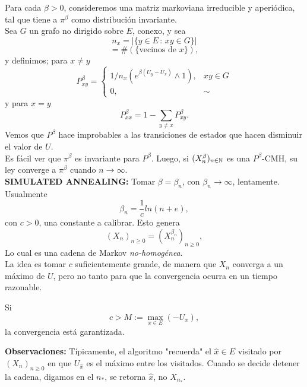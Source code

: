 Para cada $\beta >0$, consideremos una matriz markoviana irreducible y aperiódica, tal que tiene a $\pi^\beta$ como distribución invariante. \\ Sea $G$ un grafo no dirigido sobre $E$, conexo, y sea
\[n_x = |\{y \in E\,:\,xy \in G\}|\]
\[= \#\left(\{\text{vecinos de }x\}\right),\]
y definimos; para $x\neq y$
\[P_{xy}^\beta = \begin{cases}
1/n_x\left(e^{\beta(U_y-U_x)}\wedge 1\right), & xy\in G\\
0, & \sim
\end{cases}\]
y para $x=y$
\[P_{xx}^\beta = 1-\sum_{y \neq x}P_{xy}^\beta. \]
Vemos que $P^\beta$ hace improbables a las transiciones de estados que hacen disminuir el valor de $U$.\\ Es fácil ver que $\pi^\beta$ es invariante para $P^\beta$. Luego, si $(X_n^\beta)_{n\in \mathbb N}$ es una $P^\beta$-CMH, su ley converge a $\pi^\beta$ cuando $n\rightarrow \infty$. \\ \newline
\textbf{SIMULATED ANNEALING: }Tomar $\beta = \beta_n$, con $\beta_n \rightarrow \infty$, lentamente.\\ \newline
Usualmente
\[\beta_n = \frac{1}{c}ln(n+e),\]
con $c>0$, una constante a calibrar. Esto genera
\[(X_n)_{n\geq0} = (X_n^{\beta_n})_{n\geq 0},\]
Lo cual es una cadena de Markov \textit{no-homogénea}.\\La idea es tomar $c$ suficientemente grande, de manera que $X_n$ converga a un máximo de $U$, pero no tanto para que la convergencia ocurra en un tiempo razonable.
\begin{ejemplo}
Si 
\[c > M:=\max_{x \in E}\left(-U_x\right),\]
la convergencia está garantizada.
\end{ejemplo}

\textbf{Observaciones:} Típicamente, el algoritmo "recuerda" el $\hat{x}\in E$ visitado por $(X_n)_{n\geq 0}$ en que $U_{\hat{x}}$ es el máximo entre los visitados. Cuando se decide detener la cadena, digamos en el $n_{*}$, se retorna $\hat{x}$, no $X_{n_{*}}$.
